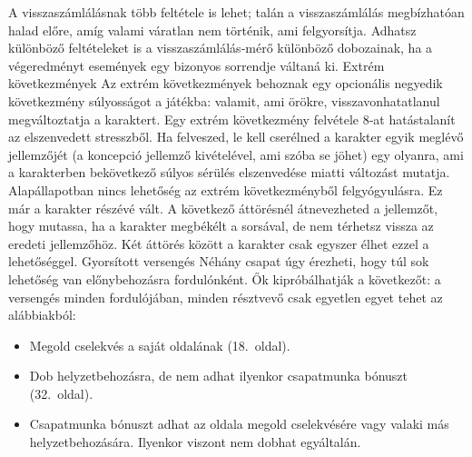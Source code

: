 \documentclass[oneside]{book}
\newcommand{\page}[1]{#1.~oldal}
\begin{document}
A visszaszámlálásnak több feltétele is lehet; talán a visszaszámlálás megbízhatóan halad előre, amíg valami váratlan nem történik, ami felgyorsítja. Adhatsz különböző feltételeket is a visszaszámlálás‑mérő különböző dobozainak, ha a végeredményt események egy bizonyos sorrendje váltaná ki.
Extrém következmények
Az extrém következmények behoznak egy opcionális negyedik következmény súlyosságot a játékba: valamit, ami örökre, visszavonhatatlanul megváltoztatja a karaktert.
Egy extrém következmény felvétele 8‑at hatástalanít az elszenvedett stresszből. Ha felveszed, le kell cserélned a karakter egyik meglévő jellemzőjét (a koncepció jellemző kivételével, ami szóba se jöhet) egy olyanra, ami a karakterben bekövetkező súlyos sérülés elszenvedése miatti változást mutatja.
Alapállapotban nincs lehetőség az extrém következményből felgyógyulásra. Ez már a karakter részévé vált. A következő áttörésnél átnevezheted a jellemzőt, hogy mutassa, ha a karakter megbékélt a sorsával, de nem térhetsz vissza az eredeti jellemzőhöz.
Két áttörés között a karakter csak egyszer élhet ezzel a lehetőséggel.
Gyorsított versengés
Néhány csapat úgy érezheti, hogy túl sok lehetőség van előnybehozásra fordulónként. Ők kipróbálhatják a következőt: a versengés minden fordulójában, minden résztvevő csak egyetlen egyet tehet az alábbiakból:

\begin{itemize}
    \item Megold cselekvés a saját oldalának (\page{18}).
    \item Dob helyzetbehozásra, de nem adhat ilyenkor csapatmunka bónuszt (\page{32}).
    \item Csapatmunka bónuszt adhat az oldala megold cselekvésére vagy valaki más helyzetbehozására. Ilyenkor viszont nem dobhat egyáltalán.
\end{itemize}
\end{document}
